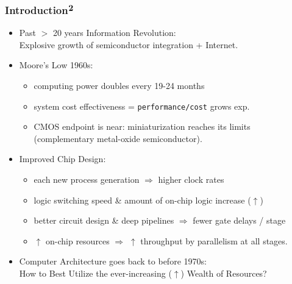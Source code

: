 \documentclass{beamer}
\renewcommand{\emph}[1]{\textcolor{structure}{#1}}
\newcommand{\emp}[1]{\textcolor{DikuRed}{ #1}}
\begin{document}
\begin{frame}[fragile,t]
\frametitle{Introduction$^{\mbox{\bf 2}}$}

\begin{itemize}
    \item Past $>$ 20 years \emph{Information Revolution}:\\
        Explosive growth of semiconductor integration + Internet.\bigskip

    \item Moore's Low 1960s: 
    \begin{itemize}
        \item computing power doubles every 19-24 months 
        \item \emph{system cost effectiveness = {\tt performance/cost} 
                grows exp}.
        \item \alert{CMOS endpoint is near}: miniaturization reaches its limits
                (complementary metal-oxide semiconductor).
    \end  {itemize}\bigskip\pause

    \item Improved Chip Design:
    \begin{itemize}
        \item each new process generation $\Rightarrow$ higher clock rates 
        \item logic switching speed \& amount of on-chip logic increase ($\uparrow$)
        \item better circuit design \& deep pipelines $\Rightarrow$ 
                fewer gate delays / stage
        \item $\uparrow$ on-chip resources $\Rightarrow$ $\uparrow$ throughput by 
                parallelism at all stages. 
    \end  {itemize}\bigskip

    \item Computer Architecture goes back to before 1970s:\\ 
            \emp{How to Best Utilize the ever-increasing ($\uparrow$) Wealth of Resources?}

\end{itemize}

\end{frame}
\end{document}
